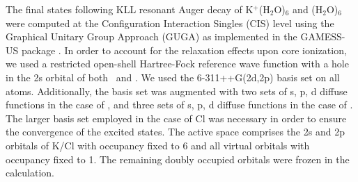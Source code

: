 The final states following KLL resonant Auger decay of K$^{+}$(H$_2$O)$_6$ and \cli(H$_2$O)$_6$ were computed at the Configuration Interaction Singles (CIS) level using the Graphical Unitary Group Approach (GUGA) as implemented in the GAMESS-US package \citep{GUGA_PhysScr_21,GUGA_JCP_70,GUS}. In order to account for the relaxation effects upon core ionization, we used a restricted open-shell Hartree-Fock reference wave function with a hole in the 2s orbital of both \ki~and \cli.  We used the 6-311++G(2d,2p) basis set \citep{Krishnan80:650,McLean80:5639,Blaudeau97:5016} on all atoms. Additionally, the basis set was augmented with two sets of s, p, d diffuse functions in the case of \ki, and three sets of s, p, d diffuse functions in the case of \cli. The larger basis set employed in the case of Cl was necessary in order to ensure the convergence of the excited states. The active space comprises the 2s and 2p orbitals of K/Cl with occupancy fixed to 6 and all virtual orbitals with occupancy fixed to 1. The remaining doubly occupied orbitals were frozen in the calculation. \citep{mosnier16:061401}